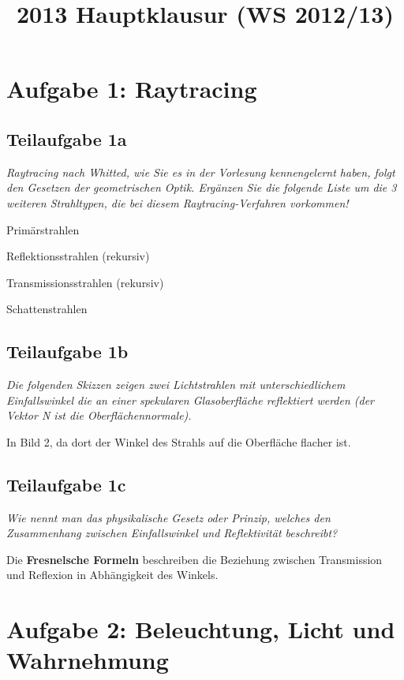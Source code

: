 \documentclass[a4paper]{scrartcl}
\begin{document}
\title{2013 Hauptklausur (WS 2012/13)}

\setcounter{section}{1}
\section*{Aufgabe 1: Raytracing}
\subsection*{Teilaufgabe 1a}
\textit{Raytracing nach Whitted, wie Sie es in der Vorlesung kennengelernt
haben, folgt den Gesetzen der geometrischen Optik. Ergänzen Sie die folgende
Liste um die 3 weiteren Strahltypen, die bei diesem Raytracing-Verfahren
vorkommen!}

\begin{enumerate*}[label=(\arabic*)]
    \item Primärstrahlen
    \item Reflektionsstrahlen (rekursiv)
    \item Transmissionsstrahlen (rekursiv)
    \item Schattenstrahlen
\end{enumerate*}

\subsection*{Teilaufgabe 1b}
\textit{Die folgenden Skizzen zeigen zwei Lichtstrahlen mit unterschiedlichem
Einfallswinkel die an einer spekularen Glasoberfläche reflektiert werden (der
Vektor N ist die Oberflächennormale).}

In Bild 2, da dort der Winkel des Strahls auf die Oberfläche flacher ist.

\subsection*{Teilaufgabe 1c}
\textit{Wie nennt man das physikalische Gesetz oder Prinzip, welches den
Zusammenhang zwischen Einfallswinkel und Reflektivität beschreibt?}

Die \textbf{Fresnelsche Formeln} beschreiben die Beziehung zwischen
Transmission und Reflexion in Abhängigkeit des Winkels.

\clearpage
\section*{Aufgabe 2: Beleuchtung, Licht und Wahrnehmung}
\end{document}
